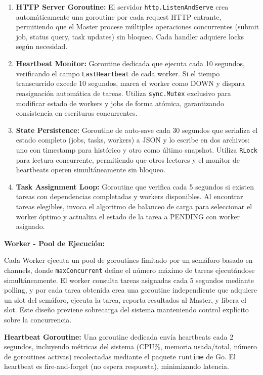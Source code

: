 \documentclass[conference]{IEEEtran}
\begin{document}
\begin{enumerate}
\item \textbf{HTTP Server Goroutine:} El servidor \texttt{http.ListenAndServe} crea automáticamente una goroutine por cada request HTTP entrante, permitiendo que el Master procese múltiples operaciones concurrentes (submit job, status query, task updates) sin bloqueo. Cada handler adquiere locks según necesidad.

\item \textbf{Heartbeat Monitor:} Goroutine dedicada que ejecuta cada 10 segundos, verificando el campo \texttt{LastHeartbeat} de cada worker. Si el tiempo transcurrido excede 10 segundos, marca el worker como DOWN y dispara reasignación automática de tareas. Utiliza \texttt{sync.Mutex} exclusivo para modificar estado de workers y jobs de forma atómica, garantizando consistencia en escrituras concurrentes.

\item \textbf{State Persistence:} Goroutine de auto-save cada 30 segundos que serializa el estado completo (jobs, tasks, workers) a JSON y lo escribe en dos archivos: uno con timestamp para histórico y otro como último snapshot. Utiliza \texttt{RLock} para lectura concurrente, permitiendo que otros lectores y el monitor de heartbeats operen simultáneamente sin bloqueo.

\item \textbf{Task Assignment Loop:} Goroutine que verifica cada 5 segundos si existen tareas con dependencias completadas y workers disponibles. Al encontrar tareas elegibles, invoca el algoritmo de balanceo de carga para seleccionar el worker óptimo y actualiza el estado de la tarea a PENDING con worker asignado.
\end{enumerate}

\textbf{Worker - Pool de Ejecución:}

Cada Worker ejecuta un pool de goroutines limitado por un semáforo basado en channels, donde \texttt{maxConcurrent} define el número máximo de tareas ejecutándose simultáneamente. El worker consulta tareas asignadas cada 5 segundos mediante polling, y por cada tarea obtenida crea una goroutine independiente que adquiere un slot del semáforo, ejecuta la tarea, reporta resultados al Master, y libera el slot. Este diseño previene sobrecarga del sistema manteniendo control explícito sobre la concurrencia.

\textbf{Heartbeat Goroutine:} Una goroutine dedicada envía heartbeats cada 2 segundos, incluyendo métricas del sistema (CPU\%, memoria usada/total, número de goroutines activas) recolectadas mediante el paquete \texttt{runtime} de Go. El heartbeat es fire-and-forget (no espera respuesta), minimizando latencia.
\end{document}
